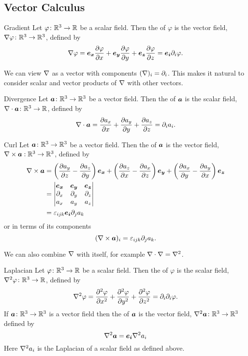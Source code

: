 \subsection{Vector Calculus}
\begin{definition}{Gradient}{}
    Let \(\varphi\colon\mathbb{R}^3\to\mathbb{R}\) be a scalar field.
    Then the  of \(\varphi\) is the vector field, \(\nabla\varphi\colon\mathbb{R}^3\to\mathbb{R}^3\), defined by
    \[\nabla\varphi = \bm{e_{x}}\pdv{\varphi}{x} + \bm{e_{y}}\pdv{\varphi}{y} + \bm{e_{z}}\pdv{\varphi}{z} = \bm{e_{i}}\partial_i\varphi.\]
\end{definition}
We can view \(\nabla\) as a vector with components \((\nabla)_i = \partial_i\).
This makes it natural to consider scalar and vector products of \(\nabla\) with other vectors.
\begin{definition}{Divergence}{}
    Let \(\bm{a}\colon\mathbb{R}^3\to\mathbb{R}^3\) be a vector field.
    Then the  of \(\bm{a}\) is the scalar field, \(\nabla\cdot\bm{a}\colon\mathbb{R}^3\to\mathbb{R}\), defined by
    \[\nabla\cdot\bm{a} = \pdv{a_x}{x} + \pdv{a_y}{y} + \pdv{a_z}{z} = \partial_ia_i.\]
\end{definition}
\begin{definition}{Curl}{}
    Let \(\bm{a}\colon\mathbb{R}^3\to\mathbb{R}^3\) be a vector field.
    Then the  of \(\bm{a}\) is the vector field, \(\nabla\times\bm{a}:\mathbb{R}^3\to\mathbb{R}^3\), defined by
    \begin{align*}
        \nabla\times\bm{a} &= \left(\pdv{a_y}{z} - \pdv{a_z}{y}\right)\bm{e_{x}} + \left(\pdv{a_z}{x} - \pdv{a_x}{z}\right)\bm{e_{y}} + \left(\pdv{a_x}{y} - \pdv{a_y}{x}\right)\bm{e_{z}}\\
        &= 
        \begin{vmatrix}
            \bm{e_{x}} & \bm{e_{y}} & \bm{e_{z}}\\
            \partial_x & \partial_y & \partial_z\\
            a_x & a_y & a_z
        \end{vmatrix}
        \\
        &= \varepsilon_{ijk}\bm{e_{i}}\partial_ja_k
    \end{align*}
    or in terms of its components
    \[(\nabla\times\bm{a})_i = \varepsilon_{ijk}\partial_ja_k.\]
\end{definition}
We can also combine \(\nabla\) with itself, for example \(\nabla\cdot\nabla = \nabla^2\).
\begin{definition}{Laplacian}{}
    Let \(\varphi\colon\mathbb{R}^3\to\mathbb{R}\) be a scalar field.
    Then the  of \(\varphi\) is the scalar field, \(\nabla^2\varphi\colon\mathbb{R}^3\to\mathbb{R}\), defined by
    \[\nabla^2\varphi = \pdv[2]{\varphi}{x} + \pdv[2]{\varphi}{y} + \pdv[2]{\varphi}{z} = \partial_i\partial_i\varphi.\]
    If \(\bm{a}\colon\mathbb{R}^3\to\mathbb{R}^3\) is a vector field then the  of \(\bm{a}\) is the vector field, \(\nabla^2\bm{a}\colon\mathbb{R}^3\to\mathbb{R}^3\) defined by
    \[\nabla^2\bm{a} = \bm{e_{i}}\nabla^2 a_i\]
    Here \(\nabla^2 a_i\) is the Laplacian of a scalar field as defined above.
\end{definition}
